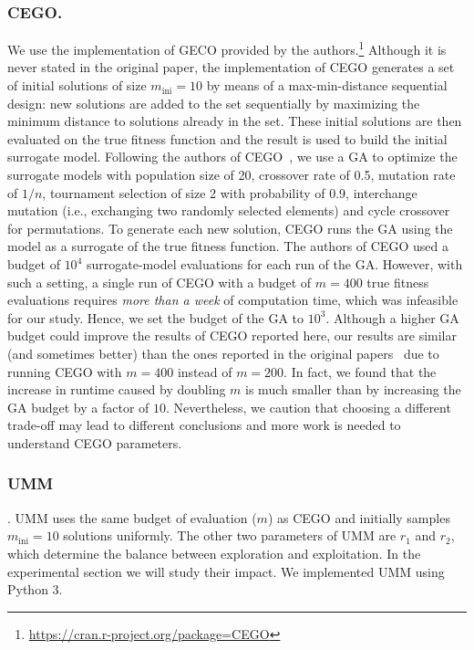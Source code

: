 \documentclass[runningheads]{llncs}
\newcommand{\minit}{\ensuremath{m_\text{ini}}\xspace}
\newcommand{\FEmax}{\ensuremath{m}}
\begin{document}
\subsubsection{CEGO.}
We use the implementation of GECO provided by the
authors.\footnote{\url{https://cran.r-project.org/package=CEGO}} %
Although it is never stated in the original paper, the implementation of CEGO
generates a set of initial solutions of size $\minit=10$ by means of a
max-min-distance sequential design: new solutions are added to the set
sequentially by maximizing the minimum distance to solutions already in the
set. These initial solutions are then evaluated on the true fitness function
and the result is used to build the initial surrogate
model. %
Following the authors of
CEGO~\citep{ZaeStoFriFisNauBar2014,ZaeStoBar2014:ppsn}, we use a GA to optimize
the surrogate models with population size of 20, crossover rate of 0.5,
mutation rate of $1/n$, tournament selection of size 2 with probability of 0.9,
interchange mutation (i.e., exchanging two randomly selected elements) and
cycle crossover for permutations. To generate each new solution, CEGO runs the
GA using the model as a surrogate of the true fitness function.  The authors of
CEGO used a budget of $10^4$ surrogate-model evaluations for each run of the
GA. However, with such a setting, a single run of CEGO with a budget of $\FEmax=400$
true fitness evaluations requires \emph{more than a week} of computation time,
which was infeasible for our study. Hence, we set the budget of the GA to
$10^3$. Although a higher GA budget could improve the results of CEGO reported
here, our results are similar (and sometimes better) than the ones reported in
the original papers~\citep{ZaeStoFriFisNauBar2014,ZaeStoBar2014:ppsn} due to
running CEGO with $\FEmax=400$ instead of $\FEmax=200$. In fact, we found that the
increase in runtime caused by doubling $\FEmax$ is much smaller than by increasing
the GA budget by a factor of $10$. Nevertheless, we caution that choosing a
different trade-off may lead to different conclusions and more work is needed
to understand CEGO parameters.

\subsubsection{UMM}. UMM uses the same budget of evaluation ($\FEmax$) as CEGO
and initially samples $\minit=10$ solutions uniformly. The other two parameters
of UMM are $r_1$ and $r_2$, which determine the balance between exploration and
exploitation. In the experimental section we will study their impact. We
implemented UMM using Python 3.
\end{document}
